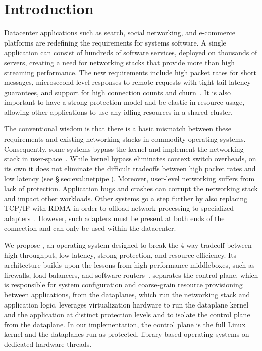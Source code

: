 
\section{Introduction}
\label{sec:intro}


Datacenter applications such as search, social networking, and
e-commerce platforms are redefining the requirements for systems
software. A single application can consist of hundreds of software
services, deployed on thousands of servers, creating a need for
networking stacks that provide more than high streaming performance.
The new requirements include high packet rates for short messages,
microsecond-level responses to remote requests with tight tail latency
guarantees, and support for high connection counts and
churn~\cite{Atikoglu:2012:WAL,DBLP:journals/cacm/DeanB13,DBLP:conf/nsdi/NishtalaFGKLLMPPSSTV13}.
It is also important to have a strong protection model and be elastic
in resource usage, allowing other applications to use any idling
resources in a shared
cluster. %

The conventional wisdom is that there is a basic mismatch between
these requirements and existing networking stacks in commodity
operating systems. Consequently, some systems bypass the kernel and
implement the networking stack in
user-space~\cite{jeong2014mtcp,DBLP:conf/cloud/KapoorPTVV12,sandstorm,openonload,DBLP:conf/sigcomm/ThekkathNML93}.
While kernel bypass eliminates context switch overheads, on its own it
does not eliminate the difficult tradeoffs between high packet rates
and low latency (see \S\ref{sec:eval:netpipe}). Moreover, user-level
networking suffers from lack of protection. Application bugs and
crashes can corrupt the networking stack and impact other workloads.
Other systems go a step further by also replacing TCP/IP with RDMA in
order to offload network processing to specialized
adapters~\cite{dragojevic14farm,DBLP:conf/icpp/JoseSLZHWIOWSP11,mitchell:rdma,DBLP:conf/sosp/OngaroRSOR11}.
However, such adapters must be present at both ends of the connection
and can only be used within the datacenter.


We propose \ix, an operating system designed to break the $4$-way
tradeoff between high throughput, low latency, strong protection, and
resource efficiency. Its architecture builds upon the lessons from
high performance middleboxes, such as firewalls, load-balancers, and
software routers~\cite{routebricks,click}. \ix separates the control
plane, which is responsible for system configuration and coarse-grain
resource provisioning between applications, from the dataplanes, which
run the networking stack and application logic.
\ix leverages virtualization hardware to run the dataplane kernel and
the application at distinct protection levels and to isolate
the control plane from the dataplane.
In our implementation, the
control plane is the full Linux kernel and the dataplanes run as
protected, library-based operating systems on dedicated hardware
threads.

